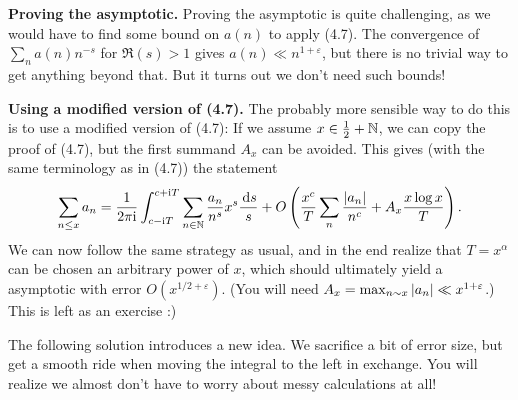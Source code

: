 \documentclass[a4paper,11pt]{article}
\begin{document}
\textbf{Proving the asymptotic.}
Proving the asymptotic is
quite challenging, as we would have to find some bound on $a(n)$ to apply (4.7).
The convergence of $\sum_n a(n)n^{-s}$ for $\Re (s)>1$ gives $a(n) \ll
n^{1+\varepsilon}$, but 
there is no trivial way to get anything beyond that.
But it turns out we don't need such bounds! 

\textbf{Using a modified version of (4.7).} The probably more sensible way to
do this is to use a modified version of 
(4.7): If we assume $x \in \frac 12 + \mathbb{N}$, we can copy the proof of (4.7), but 
the first summand $A_x$ can be avoided. This gives (with the same terminology as in 
(4.7)) the statement
\[
    \sum_{n \leq x} a_n = \frac{1}{2 \pi \mathrm i} \int_{c-\mathrm i T}^{c + \mathrm i T} \sum_{n \in
        \mathbb{N}}\frac{a_n}{n^s} x^{s} \frac {\mathrm{\,d} s}s + O\left(\frac{x^c}T \sum_n
            \frac{\left\lvert a_n \right\rvert}{n^c} + 
    A_x \frac{x \log x}T\right).
\]
We can now follow the same strategy as usual, and in the end realize
that $T = x^\alpha$ can be chosen an arbitrary power of $x$, which 
should ultimately yield a asymptotic with error $O(x^{1/2+\varepsilon})$.
(You will need $A_x = \max_{n \sim x} \left\lvert a_n \right\rvert \ll x^{1+\varepsilon}$.) This
is left as an exercise :) 

The following solution introduces a new idea. We 
sacrifice a bit of error size, but get a smooth ride when moving the integral to 
the left in exchange. You will realize we almost don't have to worry about
messy calculations at all! 
\end{document}
